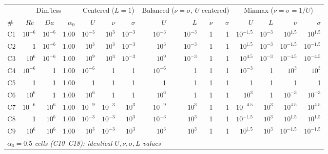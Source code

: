 \documentclass[11pt]{article}
\newcommand{\Reyn}{\operatorname{\mathit{Re}}}
\newcommand{\Damk}{\operatorname{\mathit{Da}}}
\begin{document}
\begin{table}[!htbp]
  \centering
  \footnotesize
  \setlength{\tabcolsep}{3pt}
  \begin{tabular}{l rrr rrr rrrr rrrr}
    \toprule
    & \multicolumn{3}{c}{Dim'less} &
      \multicolumn{3}{c}{Centered ($L=1$)} &
      \multicolumn{4}{c}{Balanced ($\nu = \sigma$, $U$ centered)} &
      \multicolumn{4}{c}{Minmax ($\nu = \sigma = 1/U$)} \\
    \cmidrule(lr){2-4} \cmidrule(lr){5-7} \cmidrule(lr){8-11} \cmidrule(lr){12-15}
    \# & $\Reyn$ & $\Damk$ & $\alpha_0$
       & $U$ & $\nu$ & $\sigma$
       & $U$ & $L$ & $\nu$ & $\sigma$
       & $U$ & $L$ & $\nu$ & $\sigma$ \\
    \midrule
    C1  & $10^{-6}$ & $10^{-6}$ & 1.00
        & $10^{-3}$ & $10^{3}$ & $10^{-3}$
        & $10^{-3}$ & $10^{-3}$ & 1 & 1
        & $10^{-1.5}$ & $10^{-3}$ & $10^{1.5}$ & $10^{1.5}$ \\
    C2  & 1 & $10^{-6}$ & 1.00
        & $10^{3}$ & $10^{3}$ & $10^{-3}$
        & $10^{3}$ & $10^{-3}$ & 1 & 1
        & $10^{1.5}$ & $10^{-3}$ & $10^{-1.5}$ & $10^{-1.5}$ \\
    C3  & $10^{6}$ & $10^{-6}$ & 1.00
        & $10^{9}$ & $10^{3}$ & $10^{-3}$
        & $10^{9}$ & $10^{-3}$ & 1 & 1
        & $10^{4.5}$ & $10^{-3}$ & $10^{-4.5}$ & $10^{-4.5}$ \\
    C4  & $10^{-6}$ & 1 & 1.00
        & $10^{-6}$ & 1 & 1
        & $10^{-6}$ & 1 & 1 & 1
        & $10^{-3}$ & 1 & $10^{3}$ & $10^{3}$ \\
    C5  & 1 & 1 & 1.00
        & 1 & 1 & 1
        & 1 & 1 & 1 & 1
        & 1 & 1 & 1 & 1 \\
    C6  & $10^{6}$ & 1 & 1.00
        & $10^{6}$ & 1 & 1
        & $10^{6}$ & 1 & 1 & 1
        & $10^{3}$ & 1 & $10^{-3}$ & $10^{-3}$ \\
    C7  & $10^{-6}$ & $10^{6}$ & 1.00
        & $10^{-9}$ & $10^{-3}$ & $10^{3}$
        & $10^{-9}$ & $10^{3}$ & 1 & 1
        & $10^{-4.5}$ & $10^{3}$ & $10^{4.5}$ & $10^{4.5}$ \\
    C8  & 1 & $10^{6}$ & 1.00
        & $10^{-3}$ & $10^{-3}$ & $10^{3}$
        & $10^{-3}$ & $10^{3}$ & 1 & 1
        & $10^{-1.5}$ & $10^{3}$ & $10^{1.5}$ & $10^{1.5}$ \\
    C9  & $10^{6}$ & $10^{6}$ & 1.00
        & $10^{3}$ & $10^{-3}$ & $10^{3}$
        & $10^{3}$ & $10^{3}$ & 1 & 1
        & $10^{1.5}$ & $10^{3}$ & $10^{-1.5}$ & $10^{-1.5}$ \\
    \midrule
    \multicolumn{15}{l}{\emph{$\alpha_0 = 0.5$ cells (C10--C18): identical $U, \nu, \sigma, L$ values
}}
\end{tabular}
\end{table}
\end{document}
